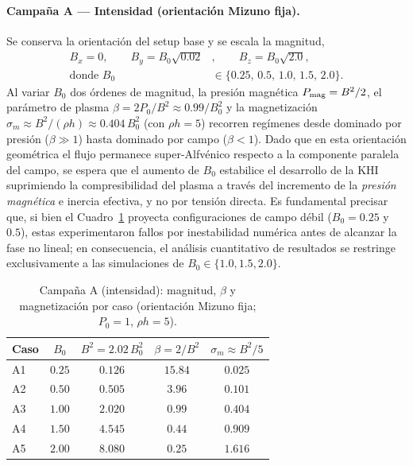 \paragraph{Campaña A — Intensidad (orientación Mizuno fija).} Se conserva la orientación del setup base y se escala la magnitud,
\begin{equation}
\begin{aligned}
B_x=0,\qquad B_y=B_0\sqrt{0.02}&,\qquad B_z=B_0\sqrt{2.0}, \\[1ex]
\text{donde } B_0 &\in \{0.25,\,0.5,\,1.0,\,1.5,\,2.0\}.
\end{aligned}
\end{equation}
Al variar $B_0$ dos órdenes de magnitud, la presión magnética $P_{\rm mag}=B^2/2$, el parámetro de plasma $\beta=2P_0/B^2\approx0.99/B_0^2$ y la magnetización $\sigma_m\approx B^2/(\rho h)\approx0.404\,B_0^2$ (con $\rho h=5$) recorren regímenes desde dominado por presión ($\beta\gg1$) hasta dominado por campo ($\beta<1$). Dado que en esta orientación geométrica el flujo permanece super-Alfvénico respecto a la componente paralela del campo, se espera que el aumento de $B_0$ estabilice el desarrollo de la KHI suprimiendo la compresibilidad del plasma a través del incremento de la \emph{presión magnética} e inercia efectiva, y no por tensión directa. Es fundamental precisar que, si bien el Cuadro~\ref{tab:campana_A} proyecta configuraciones de campo débil ($B_0=0.25$ y $0.5$), estas experimentaron fallos por inestabilidad numérica antes de alcanzar la fase no lineal; en consecuencia, el análisis cuantitativo de resultados se restringe exclusivamente a las simulaciones de $B_0 \in \{1.0, 1.5, 2.0\}$.

\begin{table}[H]\centering
\caption{Campaña A (intensidad): magnitud, $\beta$ y magnetización por caso (orientación Mizuno fija; $P_0=1$, $\rho h=5$).}
\label{tab:campana_A}
\begin{tabular}{lcccc}
\hline
Caso & $B_0$ & $B^2=2.02\,B_0^2$ & $\beta=2/B^2$ & $\sigma_m\approx B^2/5$ \\
\hline
A1 & $0.25$ & $0.126$ & $15.84$ & $0.025$ \\
A2 & $0.50$ & $0.505$ & $3.96$  & $0.101$ \\
A3 & $1.00$ & $2.020$ & $0.99$  & $0.404$ \\
A4 & $1.50$ & $4.545$ & $0.44$  & $0.909$ \\
A5 & $2.00$ & $8.080$ & $0.25$  & $1.616$ \\
\hline
\end{tabular}
\end{table}

